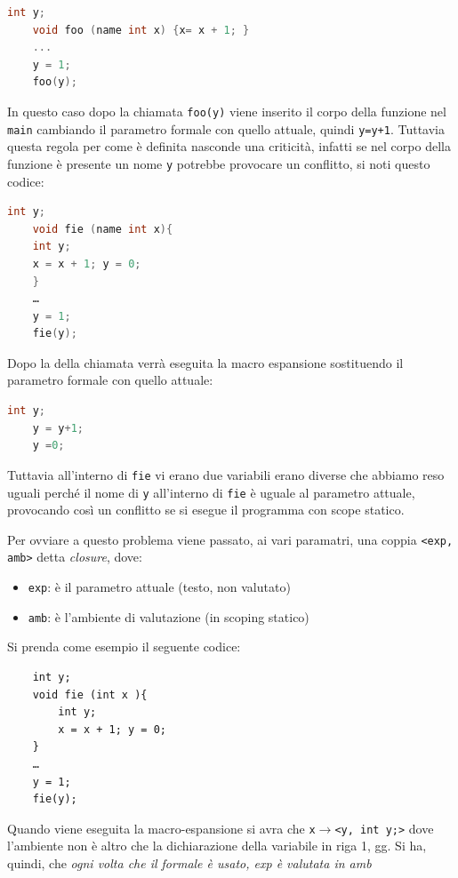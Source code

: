 \begin{itemize}
\begin{lstlisting}[language=C]
    int y;
    void foo (name int x) {x= x + 1; }
    ...
    y = 1;
    foo(y);    
\end{lstlisting}

In questo caso dopo la chiamata \texttt{foo(y)} viene inserito il corpo della funzione nel \texttt{main}  cambiando il parametro formale con quello attuale, quindi \texttt{y=y+1}. Tuttavia questa regola per come è definita nasconde una criticità, infatti se nel corpo della funzione è presente un nome \texttt{y} potrebbe provocare un conflitto, si noti questo codice:

\begin{lstlisting}[language=C]
    int y;
    void fie (name int x){
    int y;
    x = x + 1; y = 0;
    }
    …
    y = 1;
    fie(y);
\end{lstlisting}

Dopo la della chiamata verrà eseguita la macro espansione sostituendo il parametro formale con quello attuale:
\begin{lstlisting}[language=C]
    int y;
    y = y+1;
    y =0;
\end{lstlisting}

Tuttavia all'interno di \texttt{fie} vi erano due variabili erano diverse che abbiamo reso uguali perché il nome di \texttt{y} all'interno di \texttt{fie} è uguale al parametro attuale, provocando così un conflitto se si esegue il programma con scope statico. 

Per ovviare a questo problema viene passato, ai vari paramatri, una coppia \texttt{<exp, amb>} detta \textit{closure}, dove:
\begin{itemize}
    \item \texttt{exp}: è il parametro attuale (testo, non valutato)
    \item \texttt{amb}: è l’ambiente di valutazione (in scoping statico)
\end{itemize}

Si prenda come esempio il seguente codice:
\begin{lstlisting}
    int y;
    void fie (int x ){
        int y;
        x = x + 1; y = 0;
    }
    …
    y = 1;
    fie(y);
\end{lstlisting}

Quando viene eseguita la macro-espansione si avra che \texttt{x$\to$<y, int y;>} dove l'ambiente non è altro che la dichiarazione della variabile in riga 1, gg. Si ha, quindi, che \textit{ogni volta che il formale è usato, exp è valutata in amb}


\end{itemize}

